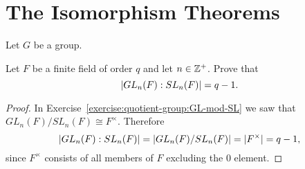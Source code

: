 \section{The Isomorphism Theorems}

Let $G$ be a group.

 Let $F$ be a finite field of order $q$ and let
$n\in\mathbb{Z}^+$. Prove that
\begin{equation*}
  \lvert{GL_n(F):SL_n(F)}\rvert = q - 1.
\end{equation*}
\begin{proof}
  In Exercise~\ref{exercise:quotient-group:GL-mod-SL} we saw that
  $GL_n(F)/SL_n(F)\cong F^\times$. Therefore
  \begin{equation*}
    \lvert{GL_n(F):SL_n(F)}\rvert
    = \lvert{GL_n(F)/SL_n(F)}\rvert
    = \lvert{F^\times}\rvert
    = q - 1,
  \end{equation*}
  since $F^\times$ consists of all members of $F$ excluding the $0$
  element.
\end{proof}

